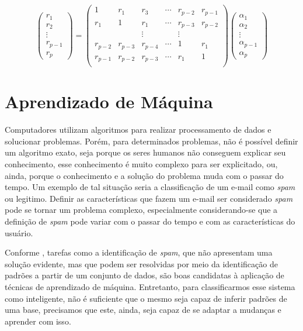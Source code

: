 \documentclass[
    12pt,
    oneside,
    a4paper,
    english,
    brazil
]{abntex2}
\begin{document}
\begin{equation}
    \label{eq:yulewalker}
    \begin{pmatrix}
        r_1\\
        r_2\\
        \vdots\\
        r_{p-1}\\
        r_p
    \end{pmatrix} =
    \begin{pmatrix}
        1 & r_1 & r_3 & \cdots & r_{p-2} & r_{p-1} \\
        r_1 & 1 & r_1 & \cdots & r_{p-3} & r_{p-2} \\
        & & \vdots & & \vdots & \\
        r_{p-2} & r_{p-3} & r_{p-4} & \cdots & 1 & r_1 \\
        r_{p-1} & r_{p-2} & r_{p-3} & \cdots & r_1 & 1 \\
    \end{pmatrix}
    \begin{pmatrix}
        \alpha_1\\
        \alpha_2\\
        \vdots\\
        \alpha_{p-1}\\
        \alpha_p
    \end{pmatrix}
\end{equation}

\section{Aprendizado de Máquina}

Computadores  utilizam  algoritmos  para  realizar  processamento  de  dados  e
solucionar  problemas.  Porém,  para  determinados problemas,  não  é  possível
definir um algoritmo exato, seja porque os seres humanos não conseguem explicar
seu conhecimento, esse conhecimento é  muito complexo para ser explicitado, ou,
ainda, porque  o conhecimento  e a  solução do  problema muda  com o  passar do
tempo.  Um exemplo  de tal  situação seria  a classificação  de um  e-mail como
\textit{spam} ou legitimo.  Definir as características que fazem  um e-mail ser
considerado \textit{spam}  pode se  tornar um problema  complexo, especialmente
considerando-se que  a definição de \textit{spam}  pode variar com o  passar do
tempo e com as características do usuário.

Conforme , tarefas como a identificação de \textit{spam}, que
não apresentam  uma solução  evidente, mas  que podem  ser resolvidas  por meio
da  identificação  de padrões  a  partir  de um  conjunto  de  dados, são  boas
candidatas à aplicação de técnicas  de aprendizado de máquina. Entretanto, para
classificarmos esse sistema como inteligente, não é suficiente que o mesmo seja
capaz de inferir padrões de uma base, precisamos que este, ainda, seja capaz de
se adaptar a mudanças e aprender com isso.
\end{document}
